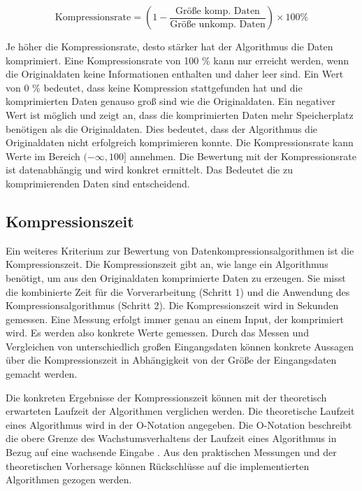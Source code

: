 \documentclass[conference]{IEEEtran}
\begin{document}
\begin{equation}
  \label{eq:komprate}
  \text{Kompressionsrate} = \left(1 - \frac{\text{Größe komp. Daten}}{\text{Größe unkomp. Daten}}\right) \times 100 \%
\end{equation}

Je höher die Kompressionsrate, desto stärker hat der Algorithmus die Daten komprimiert. 
Eine Kompressionsrate von 100 \% kann nur erreicht werden, wenn die Originaldaten keine 
Informationen enthalten und daher leer sind. 
Ein Wert von 0 \% bedeutet, dass keine Kompression stattgefunden hat und die komprimierten 
Daten genauso groß sind wie die Originaldaten. 
Ein negativer Wert ist möglich und zeigt an, dass die komprimierten Daten mehr 
Speicherplatz benötigen als die Originaldaten. Dies bedeutet, dass der Algorithmus 
die Originaldaten nicht erfolgreich komprimieren konnte. 
Die Kompressionsrate kann Werte im Bereich $(-\infty, 100]$ annehmen. 
Die Bewertung mit der Kompressionsrate ist datenabhängig und wird konkret
ermittelt.
Das Bedeutet die zu komprimierenden Daten sind entscheidend.


\subsection{Kompressionszeit}

Ein weiteres Kriterium zur Bewertung von Datenkompressionsalgorithmen ist die Kompressionszeit. 
Die Kompressionszeit gibt an, wie lange ein Algorithmus benötigt, um aus den Originaldaten 
komprimierte Daten zu erzeugen. 
Sie misst die kombinierte Zeit für die Vorverarbeitung (Schritt 1) und die Anwendung 
des Kompressionsalgorithmus (Schritt 2). 
Die Kompressionszeit wird in Sekunden gemessen. 
Eine Messung erfolgt immer genau an einem Input, der komprimiert wird. 
Es werden also konkrete Werte gemessen. 
Durch das Messen und Vergleichen von unterschiedlich großen Eingangsdaten können konkrete 
Aussagen über die Kompressionszeit in Abhängigkeit von der Größe der Eingangsdaten 
gemacht werden. 

Die konkreten Ergebnisse der Kompressionszeit können mit der theoretisch erwarteten 
Laufzeit der Algorithmen verglichen werden. 
Die theoretische Laufzeit eines Algorithmus wird in der O-Notation angegeben. 
Die O-Notation beschreibt die obere Grenze des Wachstumsverhaltens der Laufzeit eines 
Algorithmus in Bezug auf eine wachsende Eingabe \cite{chivers}.  
Aus den praktischen Messungen und der theoretischen Vorhersage können Rückschlüsse auf 
die implementierten Algorithmen gezogen werden.
\end{document}
